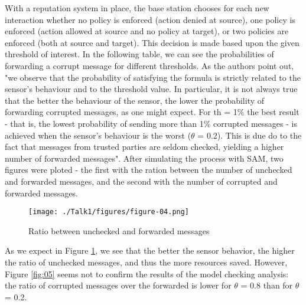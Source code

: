 \documentclass[12pt,a4paper,twoside]{report}
\begin{document}
With a reputation system in place, the base station chooses for each new interaction whether no policy is enforced (action denied at source), one policy is enforced (action allowed at source and no policy at target), or two policies are enforced (both at source and target). This decision is made based upon the given threshold of interest. In the following table, we can see the probabilities of forwarding a corrupt message for different thresholds. As the authors point out, "we observe that the probability of satisfying the formula is strictly related to the sensor's behaviour and to the threshold value. In particular, it is not always true that the better the behaviour of the sensor, the lower the probability of forwarding corrupted messages, as one might expect. For th = 1\% the best result - that is, the lowest probability of sending more than 1\% corrupted messages - is achieved when the sensor's behaviour is the worst ($\theta$ = 0.2). This is due do to the fact that messages from trusted parties are seldom checked, yielding a higher number of forwarded messages". After simulating the process with SAM, two figures were ploted - the first with the ration between the number of unchecked and forwarded messages, and the second with the number of corrupted and forwarded messages.\par

\begin{figure}[ht]
	\begin{center}
  \texttt{[image: ./Talk1/figures/figure-04.png]}
  \end{center}
  \caption{Ratio between unchecked and forwarded messages \cite{vigo;etal:2014}}
  \label{fig:04}
\end{figure}

As we expect in Figure \ref{fig:04}, we see that the better the sensor behavior, the higher the ratio of unchecked messages, and thus the more resources saved. However, Figure \ref{fig:05} seems not to confirm the results of the model checking analysis: the ratio of corrupted messages over the forwarded is lower for $\theta$ = 0.8 than for $\theta$ = 0.2. 
\end{document}

